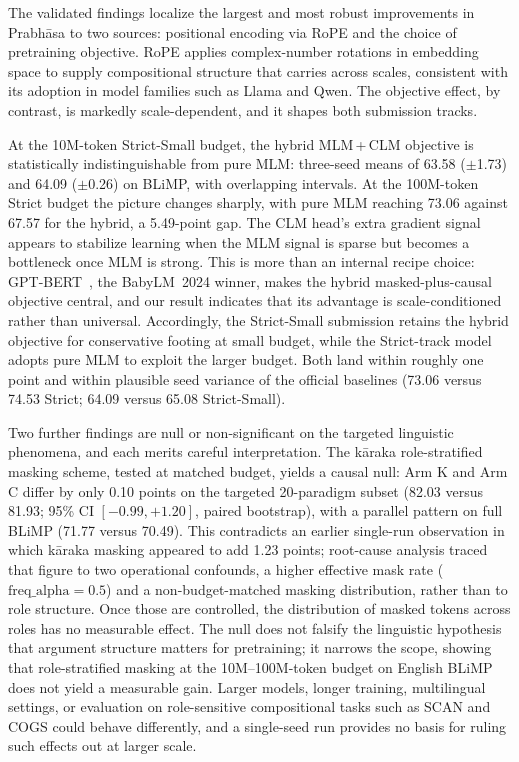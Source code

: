 
The validated findings localize the largest and most robust improvements in Prabhāsa to two sources: positional encoding via RoPE and the choice of pretraining objective. RoPE applies complex-number rotations in embedding space to supply compositional structure that carries across scales, consistent with its adoption in model families such as Llama and Qwen. The objective effect, by contrast, is markedly scale-dependent, and it shapes both submission tracks.

At the 10M-token Strict-Small budget, the hybrid MLM\,+\,CLM objective is statistically indistinguishable from pure MLM: three-seed means of 63.58 ($\pm$1.73) and 64.09 ($\pm$0.26) on BLiMP, with overlapping intervals. At the 100M-token Strict budget the picture changes sharply, with pure MLM reaching 73.06 against 67.57 for the hybrid, a 5.49-point gap. The CLM head's extra gradient signal appears to stabilize learning when the MLM signal is sparse but becomes a bottleneck once MLM is strong. This is more than an internal recipe choice: GPT-BERT~\cite{CharpentierSamuel2024}, the BabyLM~2024 winner, makes the hybrid masked-plus-causal objective central, and our result indicates that its advantage is scale-conditioned rather than universal. Accordingly, the Strict-Small submission retains the hybrid objective for conservative footing at small budget, while the Strict-track model adopts pure MLM to exploit the larger budget. Both land within roughly one point and within plausible seed variance of the official baselines (73.06 versus 74.53 Strict; 64.09 versus 65.08 Strict-Small).

Two further findings are null or non-significant on the targeted linguistic phenomena, and each merits careful interpretation. The kāraka role-stratified masking scheme, tested at matched budget, yields a causal null: Arm K and Arm C differ by only 0.10 points on the targeted 20-paradigm subset (82.03 versus 81.93; 95\% CI $[-0.99, +1.20]$, paired bootstrap), with a parallel pattern on full BLiMP (71.77 versus 70.49). This contradicts an earlier single-run observation in which kāraka masking appeared to add 1.23 points; root-cause analysis traced that figure to two operational confounds, a higher effective mask rate ($\text{freq\_alpha}=0.5$) and a non-budget-matched masking distribution, rather than to role structure. Once those are controlled, the distribution of masked tokens across roles has no measurable effect. The null does not falsify the linguistic hypothesis that argument structure matters for pretraining; it narrows the scope, showing that role-stratified masking at the 10M--100M-token budget on English BLiMP does not yield a measurable gain. Larger models, longer training, multilingual settings, or evaluation on role-sensitive compositional tasks such as SCAN and COGS could behave differently, and a single-seed run provides no basis for ruling such effects out at larger scale.

